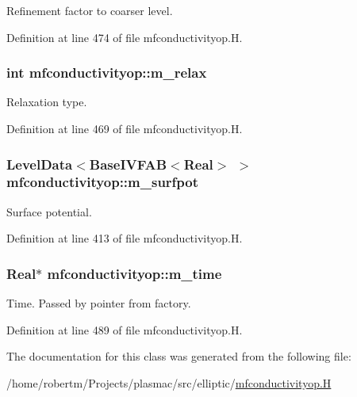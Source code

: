Refinement factor to coarser level. 



Definition at line 474 of file mfconductivityop.\+H.

\subsubsection[{\texorpdfstring{m\+\_\+relax}{m_relax}}]{\setlength{\rightskip}{0pt plus 5cm}int mfconductivityop\+::m\+\_\+relax\hspace{0.3cm}{\ttfamily [protected]}}\hypertarget{classmfconductivityop_a612bdd7edd7c7d9763de32bf360e15f7}{}\label{classmfconductivityop_a612bdd7edd7c7d9763de32bf360e15f7}


Relaxation type. 



Definition at line 469 of file mfconductivityop.\+H.

\subsubsection[{\texorpdfstring{m\+\_\+surfpot}{m_surfpot}}]{\setlength{\rightskip}{0pt plus 5cm}Level\+Data$<$Base\+I\+V\+F\+AB$<$Real$>$ $>$ mfconductivityop\+::m\+\_\+surfpot\hspace{0.3cm}{\ttfamily [protected]}}\hypertarget{classmfconductivityop_a2b1de8dbf2635f429899bdf88870388f}{}\label{classmfconductivityop_a2b1de8dbf2635f429899bdf88870388f}


Surface potential. 



Definition at line 413 of file mfconductivityop.\+H.

\subsubsection[{\texorpdfstring{m\+\_\+time}{m_time}}]{\setlength{\rightskip}{0pt plus 5cm}Real$\ast$ mfconductivityop\+::m\+\_\+time\hspace{0.3cm}{\ttfamily [protected]}}\hypertarget{classmfconductivityop_a9cb8c6fcd4bbaa222cc75f21ed457c32}{}\label{classmfconductivityop_a9cb8c6fcd4bbaa222cc75f21ed457c32}


Time. Passed by pointer from factory. 



Definition at line 489 of file mfconductivityop.\+H.



The documentation for this class was generated from the following file\+:\begin{DoxyCompactItemize}
\item 
/home/robertm/\+Projects/plasmac/src/elliptic/\hyperlink{mfconductivityop_8H}{mfconductivityop.\+H}\end{DoxyCompactItemize}
